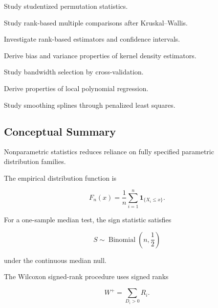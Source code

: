 \begin{exercise}[4]
Study studentized permutation statistics.
\end{exercise}

\begin{exercise}[4]
Study rank-based multiple comparisons after Kruskal--Wallis.
\end{exercise}

\begin{exercise}[4]
Investigate rank-based estimators and confidence intervals.
\end{exercise}

\begin{exercise}[4]
Derive bias and variance properties of kernel density estimators.
\end{exercise}

\begin{exercise}[4]
Study bandwidth selection by cross-validation.
\end{exercise}

\begin{exercise}[4]
Derive properties of local polynomial regression.
\end{exercise}

\begin{exercise}[4]
Study smoothing splines through penalized least squares.
\end{exercise}

\subsection{Conceptual Summary}
\label{subsec:nonparametric-summary}

Nonparametric statistics reduces reliance on fully specified parametric
distribution families.

The empirical distribution function is

\[
\boxed{
F_n(x)
=
\frac1n
\sum_{i=1}^{n}
\mathbf{1}_{\{X_i\leq x\}}.
}
\]

For a one-sample median test, the sign statistic satisfies

\[
\boxed{
S
\sim
\operatorname{Binomial}
\left(
n,\frac12
\right)
}
\]

under the continuous median null.

The Wilcoxon signed-rank procedure uses signed ranks

\[
\boxed{
W^+
=
\sum_{D_i>0}R_i.
}
\]

